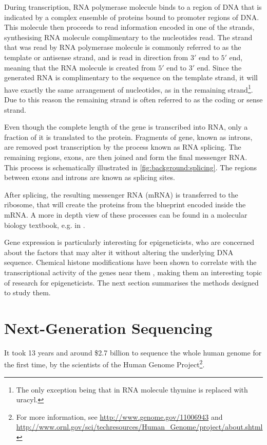\documentclass[parskip]{cs4rep}
\begin{document}
During transcription, RNA polymerase molecule binds to a region of DNA that is indicated by a complex ensemble of proteins bound to promoter regions of DNA. This molecule then proceeds to read information encoded in one of the strands, synthesising RNA molecule complimentary to the nucleotides read. The strand that was read by RNA polymerase molecule is commonly referred to as the template or antisense strand, and is read in direction from $3'$ end to $5'$ end, meaning that the RNA molecule is created from $5'$ end to $3'$ end. Since the generated RNA is complimentary to the sequence on the template strand, it will have exactly the same arrangement of nucleotides, as in the remaining strand\footnote{The only exception being that in RNA molecule thymine is replaced with uracyl.}. Due to this reason the remaining strand is often referred to as the coding or sense strand.

Even though the complete length of the gene is transcribed into RNA, only a fraction of it is translated to the protein. Fragments of gene, known as introns, are removed post transcription by the process known as RNA splicing. The remaining regions, exons, are then joined and form the final messenger RNA. This process is schematically illustrated in \autoref{fig:background:splicing}. The regions between exons and introns are known as splicing sites. 

After splicing, the resulting messenger RNA (mRNA) is transferred to the ribosome, that will create the proteins from the blueprint encoded inside the mRNA. A more in depth view of these processes can be found in a molecular biology textbook, e.g. in \cite{Alberts:2002te}.

Gene expression is particularly interesting for epigeneticists, who are concerned about the factors that may alter it without altering the underlying DNA sequence. Chemical histone modifications have been shown to correlate with the transcriptional activity of the genes near them \cite{Pokholok:2005wn,Kouzarides:2007js}, making them an interesting topic of research for epigeneticists. The next section summarises the methods designed to study them. 
 
\section{Next-Generation Sequencing}

It took 13 years and around \$2.7 billion to sequence the whole human genome for the first time, by the scientists of the Human Genome Project\footnote{For more information, see \url{http://www.genome.gov/11006943} and
    \url{http://www.ornl.gov/sci/techresources/Human_Genome/project/about.shtml}}. 
    
\end{document}
